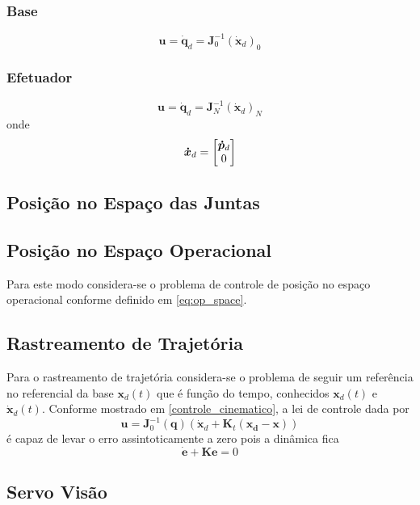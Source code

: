 \subsubsection{Base}
\begin{equation}
\bm{u} = \bm{\dot{q}}_d = \bm{J}_0^{-1} (\bm{\dot{x}}_d)_0
\end{equation}
\subsubsection{Efetuador}
\begin{equation}
\bm{u} = \bm{\dot{q}}_d = \bm{J}_N^{-1} (\bm{\dot{x}}_d)_N
\end{equation}
onde 
\begin{equation}
\bm{\dot{x}}_d = \begin{bmatrix}\bm{\dot{p}}_d \\ 0\end{bmatrix}
\end{equation}


\subsection{Posição no Espaço das Juntas}


\subsection{Posição no Espaço Operacional}
Para este modo considera-se o problema de controle de posição no espaço operacional conforme definido em \ref{eq:op_space}. 

\subsection{Rastreamento de Trajetória}
Para o rastreamento de trajetória considera-se o problema de seguir um referência no referencial da base $\bm{x}_d(t)$ que é função do tempo, conhecidos $\bm{x}_d(t)$ e $\bm{\dot{x}}_d(t)$. Conforme mostrado em \ref{controle_cinematico}, a lei de controle dada por 
\begin{equation}
\bm{u} = \bm{J}_0^{-1}(\bm{q}) (\dot{\bm{x}}_d + \bm{K}_t (\bm{x_d} - \bm{x}))
\end{equation} 
é capaz de levar o erro assintoticamente a zero pois a dinâmica fica 
\begin{equation}
\dot{\bm{e}} + \bm{K} \bm{e} = 0
\end{equation}


\subsection{Servo Visão}
